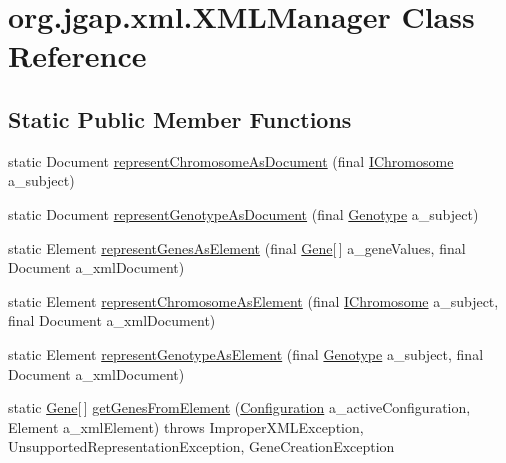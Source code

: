 \hypertarget{classorg_1_1jgap_1_1xml_1_1_x_m_l_manager}{\section{org.\-jgap.\-xml.\-X\-M\-L\-Manager Class Reference}
\label{classorg_1_1jgap_1_1xml_1_1_x_m_l_manager}
}
\subsection*{Static Public Member Functions}
\begin{DoxyCompactItemize}
\item 
static Document \hyperlink{classorg_1_1jgap_1_1xml_1_1_x_m_l_manager_a3a6c7c2c33542ceec519b33330a839e2}{represent\-Chromosome\-As\-Document} (final \hyperlink{interfaceorg_1_1jgap_1_1_i_chromosome}{I\-Chromosome} a\-\_\-subject)
\item 
static Document \hyperlink{classorg_1_1jgap_1_1xml_1_1_x_m_l_manager_af51f0db3ed6f03635b9b4dbb286bd08d}{represent\-Genotype\-As\-Document} (final \hyperlink{classorg_1_1jgap_1_1_genotype}{Genotype} a\-\_\-subject)
\item 
static Element \hyperlink{classorg_1_1jgap_1_1xml_1_1_x_m_l_manager_a9383eb28213ec1690e56e7db10a6b022}{represent\-Genes\-As\-Element} (final \hyperlink{interfaceorg_1_1jgap_1_1_gene}{Gene}\mbox{[}$\,$\mbox{]} a\-\_\-gene\-Values, final Document a\-\_\-xml\-Document)
\item 
static Element \hyperlink{classorg_1_1jgap_1_1xml_1_1_x_m_l_manager_a6da62b7bb444f46df933d355239983f0}{represent\-Chromosome\-As\-Element} (final \hyperlink{interfaceorg_1_1jgap_1_1_i_chromosome}{I\-Chromosome} a\-\_\-subject, final Document a\-\_\-xml\-Document)
\item 
static Element \hyperlink{classorg_1_1jgap_1_1xml_1_1_x_m_l_manager_a699f9db0852b3d50f7d5ab67fccd9ef2}{represent\-Genotype\-As\-Element} (final \hyperlink{classorg_1_1jgap_1_1_genotype}{Genotype} a\-\_\-subject, final Document a\-\_\-xml\-Document)
\item 
static \hyperlink{interfaceorg_1_1jgap_1_1_gene}{Gene}\mbox{[}$\,$\mbox{]} \hyperlink{classorg_1_1jgap_1_1xml_1_1_x_m_l_manager_a5d1dc1049209712a797ebb264060a98f}{get\-Genes\-From\-Element} (\hyperlink{classorg_1_1jgap_1_1_configuration}{Configuration} a\-\_\-active\-Configuration, Element a\-\_\-xml\-Element)  throws Improper\-X\-M\-L\-Exception, Unsupported\-Representation\-Exception,       Gene\-Creation\-Exception 

\end{DoxyCompactItemize}

